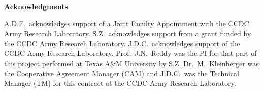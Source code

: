 \documentclass[final,3p,12pt]{elsarticle}
\begin{document}


\newpage
\setcounter{part}{0}


\newpage
\setcounter{equation}{0}
\setcounter{figure}{0}
\setcounter{section}{0}
\setcounter{table}{0}


\newpage
\setcounter{equation}{0}
\setcounter{figure}{0}
\setcounter{section}{0}
\setcounter{table}{0}


\newpage
\setcounter{equation}{0}
\setcounter{figure}{0}
\setcounter{section}{0}
\setcounter{table}{0}


\newpage
\setcounter{equation}{0}
\setcounter{figure}{0}
\setcounter{section}{0}
\setcounter{table}{0}


\newpage
\setcounter{equation}{0}
\setcounter{figure}{0}
\setcounter{section}{0}
\setcounter{table}{0}


\newpage
\noindent\textbf{Acknowledgments}

\medskip
\noindent
A.D.F.\ acknowledges support of a Joint Faculty Appointment with the CCDC Army Research Laboratory.
S.Z.\ acknowledges support from a grant funded by the CCDC Army Research Laboratory. 
J.D.C.\ acknowledges support of the CCDC Army Research Laboratory.  
Prof.\ J.N.\ Reddy was the PI for that part of this project performed at Texas A\&M University by S.Z. 
Dr.\ M.\ Kleinberger was the Cooperative Agreement Manager (CAM) and J.D.C.\ was the Technical Manager (TM) for this contract at the CCDC Army Research Laboratory.

\small


\normalsize

\setcounter{equation}{0}
\setcounter{figure}{0}
\setcounter{table}{0}

\appendix



\newpage


\newpage


\newpage


\newpage


\newpage


\newpage


\newpage

\end{document}
